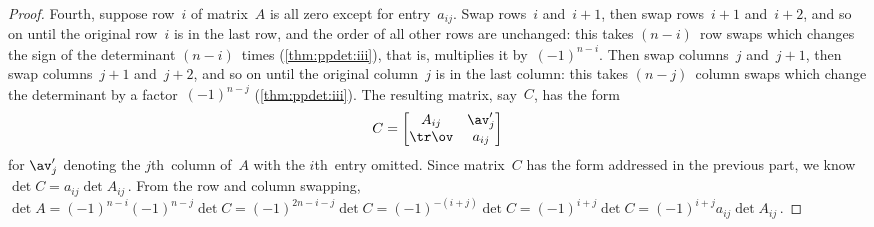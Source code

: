 \begin{proof}
Fourth, suppose row~\(i\) of matrix~\(A\) is all zero except for entry~\(a_{ij}\).
Swap rows~\(i\) and~\(i+1\), then swap rows~\(i+1\) and~\(i+2\), and so on until the original row~\(i\) is in the last row, and the order of all other rows are unchanged: this takes \((n-i)\)~row swaps which changes the sign of the determinant \((n-i)\)~times (\cref{thm:ppdet:iii}), that is, multiplies it by~\((-1)^{n-i}\).
Then swap columns~\(j\) and~\(j+1\), then swap columns~\(j+1\) and~\(j+2\), and so on until the original column~\(j\) is in the last column: this takes \((n-j)\)~column swaps which change the determinant by a factor~\((-1)^{n-j}\) (\cref{thm:ppdet:iii}).
The resulting matrix, say~\(C\), has the form
\begin{equation*}
C=\begin{bmatrix} A_{ij}&\av'_j\\\tr\ov&a_{ij} \end{bmatrix}
\end{equation*}
for \(\av'_j\) denoting the \(j\)th~column of~\(A\) with the \(i\)th~entry omitted.
Since matrix~\(C\) has the form addressed in the previous part, we know \(\det C=a_{ij}\det A_{ij}\)\,.
From the row and column swapping, \(\det A=(-1)^{n-i}(-1)^{n-j}\det C =(-1)^{2n-i-j}\det C =(-1)^{-(i+j)}\det C =(-1)^{i+j}\det C =(-1)^{i+j}a_{ij}\det A_{ij}\)\,.
\end{proof}




